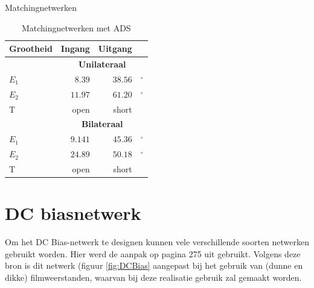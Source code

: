   \begin{table}[h!]
     \begin{center}
       \caption{Matchingnetwerken}
       \label{tbl:Matching}
       
     \end{center}
  \end{table}
  
  \begin{table}[h!]
     \begin{center}
       \caption{Matchingnetwerken met ADS}
       \label{tbl:MatchingADS}
       \begin{tabular}{|l|r|r|l|}
         \hline \textbf{Grootheid} & \textbf{Ingang} & \textbf{Uitgang} & \\
         \hline &\multicolumn{3}{|c|}{\textbf{Unilateraal}} \\
         \hline $E_1$ & $8.39$ & $38.56$ & $^{\circ}$\\
         \hline $E_2$ & $11.97$ & $61.20$ & $^{\circ}$\\
         \hline T & open & short & \\
         \hline &\multicolumn{3}{|c|}{\textbf{Bilateraal}} \\
         \hline $E_1$ & $9.141$ & $45.36$ & $^{\circ}$\\
         \hline $E_2$ & $24.89$ & $50.18$ & $^{\circ}$\\
         \hline T & open & short & \\ 
         \hline
       \end{tabular}
     \end{center}
  \end{table}


\section{DC biasnetwerk}
  Om het DC Bias-netwerk te designen kunnen vele verschillende soorten
  netwerken gebruikt worden. Hier werd de aanpak op pagina 275 uit \cite{Gonzalez}
  gebruikt. Volgens deze bron is dit netwerk (figuur \ref{fig:DCBias} aangepast
  bij het gebruik van (dunne en dikke) filmweerstanden, waarvan bij deze realisatie
  gebruik zal gemaakt worden.

